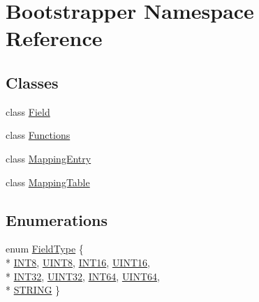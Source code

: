 \hypertarget{namespaceBootstrapper}{}\section{Bootstrapper Namespace Reference}
\label{namespaceBootstrapper}
\subsection*{Classes}
\begin{DoxyCompactItemize}
\item 
class \hyperlink{classBootstrapper_1_1Field}{Field}
\item 
class \hyperlink{classBootstrapper_1_1Functions}{Functions}
\item 
class \hyperlink{classBootstrapper_1_1MappingEntry}{Mapping\+Entry}
\item 
class \hyperlink{classBootstrapper_1_1MappingTable}{Mapping\+Table}
\end{DoxyCompactItemize}
\subsection*{Enumerations}
\begin{DoxyCompactItemize}
\item 
enum \hyperlink{namespaceBootstrapper_abb268c54c14e352b0204f5f0f928955f}{Field\+Type} \{ \\*
\hyperlink{namespaceBootstrapper_abb268c54c14e352b0204f5f0f928955fa001c8b12ac704b4db68a01e3370ddd8d}{I\+N\+T8}, 
\hyperlink{namespaceBootstrapper_abb268c54c14e352b0204f5f0f928955fa886b02661971702b333fdfc34074ed37}{U\+I\+N\+T8}, 
\hyperlink{namespaceBootstrapper_abb268c54c14e352b0204f5f0f928955faab1430101097343d6a64b346cd49f1d0}{I\+N\+T16}, 
\hyperlink{namespaceBootstrapper_abb268c54c14e352b0204f5f0f928955faade6d195d4977e8cf9b4d9d037afe491}{U\+I\+N\+T16}, 
\\*
\hyperlink{namespaceBootstrapper_abb268c54c14e352b0204f5f0f928955fa10f032b50f60ae67c2d6f8ec4a42f150}{I\+N\+T32}, 
\hyperlink{namespaceBootstrapper_abb268c54c14e352b0204f5f0f928955fa141950e4fc223088d1082efd0d7e5df1}{U\+I\+N\+T32}, 
\hyperlink{namespaceBootstrapper_abb268c54c14e352b0204f5f0f928955fadce9275f9e597fce4aed70767be87bb0}{I\+N\+T64}, 
\hyperlink{namespaceBootstrapper_abb268c54c14e352b0204f5f0f928955fa68e00d87d9675889ad661b897f72850a}{U\+I\+N\+T64}, 
\\*
\hyperlink{namespaceBootstrapper_abb268c54c14e352b0204f5f0f928955faea5c773ee7aa5e8c8c9c1cb8093fbc15}{S\+T\+R\+I\+N\+G}
 \}
\end{DoxyCompactItemize}



